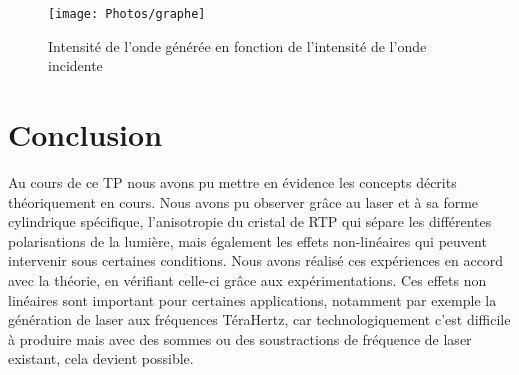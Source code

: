 \documentclass[a4paper,11pt]{report}
\begin{document}
\begin{figure}[H]
    \centering
    \texttt{[image: Photos/graphe]}
    \caption{Intensité de l'onde générée en fonction de l'intensité de l'onde incidente}
    \label{Intensité}
\end{figure}


\chapter*{Conclusion} 
Au cours de ce TP nous avons pu mettre en évidence les concepts décrits théoriquement en cours. Nous avons pu observer grâce au laser et à sa forme cylindrique spécifique, l'anisotropie du cristal de RTP qui sépare les différentes polarisations de la lumière, mais également les effets non-linéaires qui peuvent intervenir sous certaines conditions. Nous avons réalisé ces expériences en accord avec la théorie, en vérifiant celle-ci grâce aux expérimentations. Ces effets non linéaires sont important pour certaines applications, notamment par exemple la génération de laser aux fréquences TéraHertz, car technologiquement c'est difficile à produire mais avec des sommes ou des soustractions de fréquence de laser existant, cela devient possible.
\end{document}

